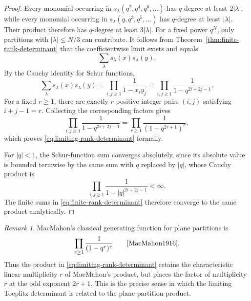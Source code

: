 \documentclass[11pt]{article}
\theoremstyle{definition}
\theoremstyle{remark}
\newtheorem{remark}[theorem]{Remark}
\begin{document}
\begin{proof}
Every monomial occurring in
$s_\lambda(q^2,q^4,q^6,\ldots)$ has $q$-degree at least $2|\lambda|$, while
every monomial occurring in $s_\lambda(q,q^3,q^5,\ldots)$ has $q$-degree at
least $|\lambda|$.  Their product therefore has $q$-degree at least
$3|\lambda|$.  For a fixed power $q^N$, only partitions with
$|\lambda|\leq N/3$ can contribute.  It follows from
Theorem~\ref{thm:finite-rank-determinant} that the coefficientwise limit exists
and equals
\[
 \sum_\lambda s_\lambda(x)s_\lambda(y).
\]
By the Cauchy identity for Schur functions,
\[
 \sum_\lambda s_\lambda(x)s_\lambda(y)
 =\prod_{i,j\geq1}\frac{1}{1-x_iy_j}
 =\prod_{i,j\geq1}\frac{1}{1-q^{2i+2j-1}}.
\]
For a fixed $r\geq1$, there are exactly $r$ positive integer pairs $(i,j)$
satisfying $i+j-1=r$.  Collecting the corresponding factors gives
\[
 \prod_{i,j\geq1}\frac{1}{1-q^{2i+2j-1}}
 =\prod_{r\geq1}\frac{1}{(1-q^{2r+1})^r},
\]
which proves \eqref{eq:limiting-rank-determinant} formally.

For $|q|<1$, the Schur-function sum converges absolutely, since its absolute
value is bounded termwise by the same sum with $q$ replaced by $|q|$, whose
Cauchy product is
\[
 \prod_{i,j\geq1}\frac{1}{1-|q|^{2i+2j-1}}<\infty.
\]
The finite sums in \eqref{eq:finite-rank-determinant} therefore converge to the
same product analytically.
\end{proof}

\begin{remark}
MacMahon's classical generating function for plane partitions is
\[
 \prod_{r\geq1}\frac{1}{(1-q^r)^r}
 \qquad\text{\cite{MacMahon1916}}.
\]
Thus the product in \eqref{eq:limiting-rank-determinant} retains the characteristic linear multiplicity $r$ of MacMahon's product, but places the factor of multiplicity $r$ at the odd exponent $2r+1$.  This is the precise sense in which the limiting Toeplitz determinant is related to the plane-partition product.
\end{remark}
\end{document}

